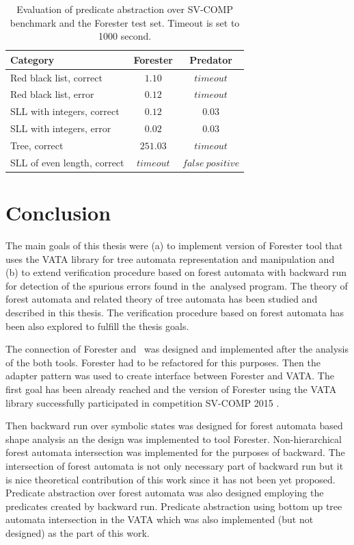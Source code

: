 \begin{table}[h]
	\vskip6pt
	\caption{Evaluation of predicate abstraction over SV-COMP benchmark
		and the Forester test set.
		Timeout is set to 1000 second.
	}
	\centering
	\begin{tabular}{lcc}
		\toprule
		Category & Forester & Predator  \\
		\midrule
		Red black list, correct     & $1.10$   &  $timeout$ \\
		Red black list, error       & $0.12$   &  $timeout$ \\
		SLL with integers, correct  & $0.12$   &  $0.03$ \\
		SLL with integers, error    & $0.02$   &  $0.03$ \\
		Tree, correct               & $251.03$ &  $timeout$ \\
		SLL of even length, correct & $timeout$ & $false\ positive$ \\
		\bottomrule
	\end{tabular}
	\label{tab:patimes}
\end{table}


\chapter{Conclusion}
\label{ch:concl}

The main goals of this thesis were (a) to implement version of Forester tool
that uses the VATA library for tree automata representation and manipulation
and (b) to extend verification procedure based on forest automata with
backward run for detection of the spurious errors found in the~analysed program.
The theory of forest automata and related theory of tree automata has been studied
and described in this thesis.
The verification procedure based on forest automata
has been also explored to fulfill the thesis goals.

The connection of Forester and \vata\ was designed and implemented
after the analysis of the both tools.
Forester had to be refactored for this purposes.
Then the adapter pattern was used to create interface between Forester and VATA.
The first goal has been already reached and the version of Forester
using the VATA library successfully participated in competition SV-COMP 2015 \cite{www:svcomp}.

Then backward run over symbolic states was designed for forest automata based shape analysis
an the design was implemented to tool Forester.
Non-hierarchical forest automata intersection was implemented for
the purposes of backward.
The intersection of forest automata is not only necessary part of backward run
but it is nice theoretical contribution of this work since it has not
been yet proposed.
Predicate abstraction over forest automata was also designed employing the predicates
created by backward run.
Predicate abstraction using bottom up tree automata intersection in the VATA
which was also implemented (but not designed) as the part of this work.

